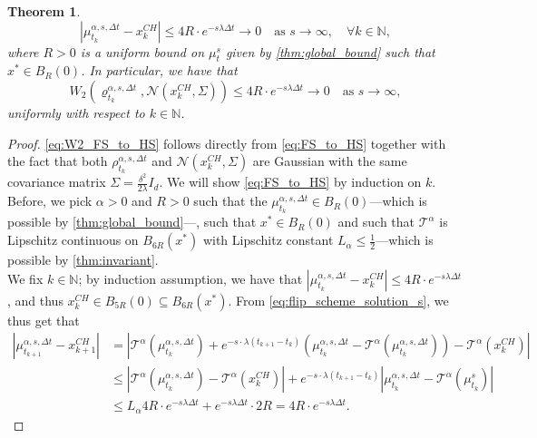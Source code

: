 \documentclass[reqno]{amsart}
\numberwithin{algorithm}{section}
\newcommand{\NN}{{\mathbb N}}
\newcommand{\mc}[1]{\mathcal{#1}}
\newtheorem{theorem}{Theorem}[section]
\begin{document}
{\begin{theorem}
    \begin{equation}\label{eq:FS_to_HS}
        |\mu^{\alpha,s,\Delta t}_{t_k} - x_k^{CH}| \leq 4 R \cdot e^{-s \lambda \Delta t} \to 0 \quad \text{as } s \to \infty, \quad \forall k \in \NN,
    \end{equation}
    where $R > 0$ is a uniform bound on $\mu_t^s$ given by \cref{thm:global_bound} such that $x^* \in B_R(0)$.
    In particular, we have that
    \begin{equation}\label{eq:W2_FS_to_HS}
        W_2(\varrho_{t_k}^{\alpha,s,\Delta t}, \mathcal{N}(x_k^{CH}, \Sigma)) \leq 4 R \cdot e^{-s \lambda \Delta t} \to 0 \quad \text{as } s \to \infty,
    \end{equation}
    {uniformly with respect to $k\in \mathbb N$}.
\end{theorem}
\begin{proof}
    \cref{eq:W2_FS_to_HS} follows directly from \cref{eq:FS_to_HS} together with the fact that both $\rho_{t_k}^{\alpha,s,\Delta t}$ and $\mathcal{N}(x_k^{CH}, \Sigma)$ are Gaussian with the same covariance matrix $\Sigma = \frac{\delta^2}{2\lambda} I_d$. We will show \cref{eq:FS_to_HS} by induction on $k$. Before, we pick $\alpha > 0$ and $R > 0$ such that the $\mu_{t_k}^{\alpha,s,\Delta t}\in B_R(0)$---which is possible by \cref{thm:global_bound}---, such that $x^* \in B_R(0)$ and such that $\mc{T}^\alpha$ is Lipschitz continuous on $B_{6R}(x^*)$ with Lipschitz constant $L_\alpha \leq \frac{1}{2}$---which is possible by \cref{thm:invariant}. \\ 
    We fix $k \in \mathbb{N}$; by induction assumption, we have that $|\mu^{\alpha,s,\Delta t}_{t_k} - x_k^{CH}| \leq 4 R \cdot e^{-s \lambda \Delta t}$, and thus $x_k^{CH} \in B_{5R}(0) \subseteq B_{6R}(x^*)$. From \cref{eq:flip_scheme_solution_s}, we thus get that 
    \begin{equation*}
        \begin{split}
    |\mu_{t_{k+1}}^{\alpha,s,\Delta t}- x_{k+1}^{CH}| &= |\mc{T}^\alpha(\mu_{t_k}^{\alpha,s,\Delta t}) + e^{-s \cdot \lambda(t_{k+1}-t_k)}(\mu_{t_k}^{\alpha,s,\Delta t} - \mc{T}^\alpha(\mu_{t_k}^{\alpha,s,\Delta t})) - \mc{T}^\alpha(x_k^{CH})| \\
    &\leq |\mc{T}^\alpha(\mu_{t_k}^{\alpha,s,\Delta t}) - \mc{T}^\alpha(x_k^{CH})| + e^{-s \cdot \lambda(t_{k+1}-t_k)}|\mu_{t_k}^{\alpha,s,\Delta t} - \mc{T}^\alpha(\mu_{t_k}^s)| \\
    &\leq L_\alpha 4 R \cdot e^{-s \lambda \Delta t} + e^{-s \lambda \Delta t} \cdot 2 R = 4 R \cdot e^{-s \lambda \Delta t}.
        \end{split}
    \end{equation*}
\end{proof}

}
\end{document}
